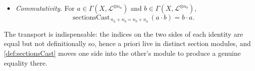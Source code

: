 \begin{lemma}
\begin{itemize}
      \(b \in \Gamma(X, \mathcal{L}^{\otimes n_b})\),
      \(c \in \Gamma(X, \mathcal{L}^{\otimes n_c})\),
      \[
        \mathrm{sectionsCast}_{\,(n_a+n_b)+n_c = n_a+(n_b+n_c)}\,
          ((a \cdot b) \cdot c) = a \cdot (b \cdot c) .
      \]
    \item \emph{Commutativity.} For
      \(a \in \Gamma(X, \mathcal{L}^{\otimes n_a})\) and
      \(b \in \Gamma(X, \mathcal{L}^{\otimes n_b})\),
      \[
        \mathrm{sectionsCast}_{\,n_a+n_b = n_b+n_a}\,(a \cdot b) = b \cdot a .
      \]
  \end{itemize}
  The transport is indispensable: the indices on the two sides of each identity
  are equal but not definitionally so, hence a priori live in distinct section
  modules, and \cref{def:sectionsCast} moves one side into the other's module to
  produce a genuine equality there.
\end{lemma}

